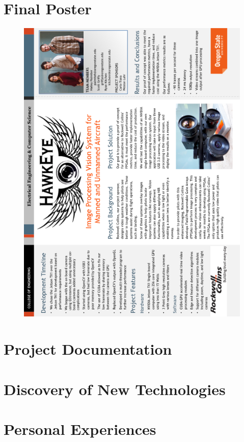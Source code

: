 \documentclass[letterpaper, onecolumn,10pt,draftclsnofoot]{IEEEtran}
\begin{document}
\section{Final Poster}
\begin{figure}[H] 
	\centering
	\includegraphics[width=\textwidth,height=\textheight,keepaspectratio]{images/HawkEye_Poster.png}  
	\end{figure}

\section{Project Documentation}

\section{Discovery of New Technologies}

\section{Personal Experiences}
\end{document}
